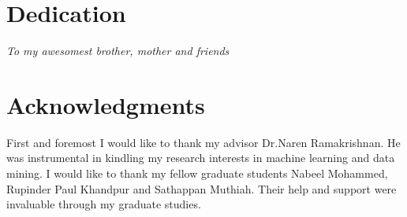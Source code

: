 \documentclass[12pt]{report}
\begin{document}
\chapter*{Dedication}
\vspace*{\fill}
\begin{center}
\Large\textit{To my awesomest brother, mother and friends}
\end{center}
\vspace{\fill}

\chapter*{Acknowledgments}
\vspace*{\fill}
\Large{First and foremost I would like to thank my advisor Dr.Naren Ramakrishnan. He was instrumental in kindling my research interests in machine learning and data mining.
\newline I would like to thank my fellow graduate students Nabeel Mohammed, Rupinder Paul Khandpur and Sathappan Muthiah. Their help and support were invaluable through my graduate studies.
}
\vspace{\fill}

\tableofcontents
\pagebreak

\listoffigures
\pagebreak

\listoftables
\pagebreak

\pagestyle{myheadings}









%
%

%

\end{document}

